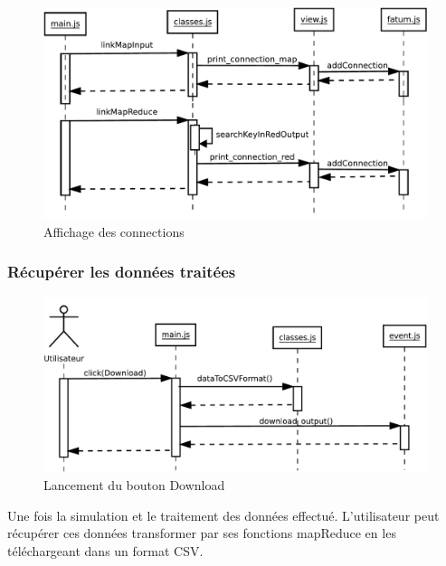 \begin{figure}[H]
  \centering
    \includegraphics[scale=0.6]{diagram/print_connection.pdf}
        \caption{Affichage des connections}
\end{figure}

\subsubsection{Récupérer les données traitées}
\begin{figure}[H]
  \centering
    \includegraphics[scale=0.6]{diagram/download.pdf}
        \caption{Lancement du bouton Download}
\end{figure}
Une fois la simulation et le traitement des données effectué. L'utilisateur peut récupérer ces données transformer par ses fonctions mapReduce en les téléchargeant dans un format CSV.

